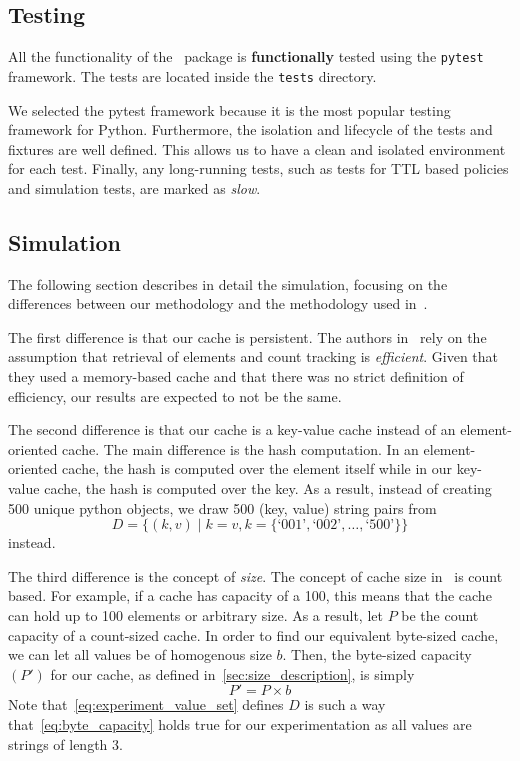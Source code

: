 \subsection{Testing}
All the functionality of the \sqlitecache~package is \textbf{functionally} tested using
the \texttt{pytest} framework. The tests are located inside the \texttt{tests} directory.

We selected the pytest framework because it is the most popular testing framework
for Python. Furthermore, the isolation and lifecycle of the tests and fixtures
are well defined. This allows us to have a clean and isolated environment
for each test. Finally, any long-running tests,
such as tests for TTL based policies and simulation tests,
are marked as \textit{slow}.

\subsection{Simulation\label{sec:simulation}}
The following section describes in detail the simulation, focusing on the differences
between our methodology and the methodology used in~\cite{shah2023ImprovedCacheEviction}.

The first difference is that our cache is persistent.
The authors in~\cite{shah2023ImprovedCacheEviction} rely on the assumption
that retrieval of elements and count tracking is \textit{efficient}. Given
that they used a memory-based cache and that there was no strict definition
of efficiency, our results are expected to not be the same.

The second difference is that our cache is a key-value cache instead
of an element-oriented cache. The main difference is the hash computation.
In an element-oriented cache, the hash is computed over the element itself
while in our key-value cache, the hash is computed over the key.
As a result, instead of creating 500 unique python objects,
we draw 500 (key, value) string pairs from
\begin{equation}
D = \{(k, v) \mid k = v, k = \{\text{`001'}, \text{`002'}, \ldots, \text{`500'}\}\}
\label{eq:experiment_value_set}
\end{equation}
instead.

The third difference is the concept of \textit{size}.
The concept of cache size in~\cite{shah2023ImprovedCacheEviction}
is count based. For example, if a cache has capacity of a 100,
this means that the cache can hold up to 100 elements or
arbitrary size. As a result, let $P$ be the count capacity
of a count-sized cache. In order to find our equivalent byte-sized
cache, we can let all values be of homogenous size $b$.
Then, the byte-sized capacity $(P')$ for our cache, as defined
in~\ref{sec:size_description}, is simply
\begin{equation}
    P' = P \times b
    \label{eq:byte_capacity}
\end{equation}
Note that~\autoref{eq:experiment_value_set} defines $D$ is such a way
that~\autoref{eq:byte_capacity} holds true for our experimentation
as all values are strings of length 3.

